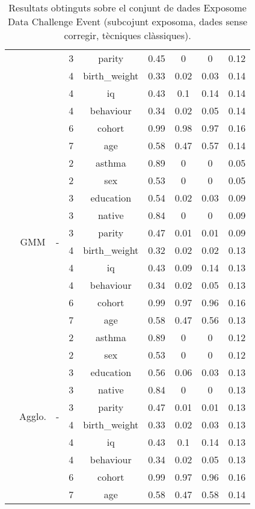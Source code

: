 \documentclass[CAT,BIB]{TFUOC}%
\begin{document}
\begin{table}
\begin{tabular}{@{}ccccccccc@{}}
            &  &  & 3 & parity & 0.45 & 0 & 0 & 0.12 \\
            &  &  & 4 & birth\_weight & 0.33 & 0.02 & 0.03 & 0.14 \\
            &  &  & 4 & iq & 0.43 & 0.1 & 0.14 & 0.14 \\
            &  &  & 4 & behaviour & 0.34 & 0.02 & 0.05 & 0.14 \\
            &  &  & 6 & cohort & 0.99 & 0.98 & 0.97 & 0.16 \\
            &  &  & 7 & age & 0.58 & 0.47 & 0.57 & 0.14 \\ \cmidrule(l){2-9}
            & \multirow{10}{*}{GMM} & \multirow{10}{*}{-} & 2 & asthma & 0.89 & 0 & 0 & 0.05 \\
            &  &  & 2 & sex & 0.53 & 0 & 0 & 0.05 \\
            &  &  & 3 & education & 0.54 & 0.02 & 0.03 & 0.09 \\
            &  &  & 3 & native & 0.84 & 0 & 0 & 0.09 \\
            &  &  & 3 & parity & 0.47 & 0.01 & 0.01 & 0.09 \\
            &  &  & 4 & birth\_weight & 0.32 & 0.02 & 0.02 & 0.13 \\
            &  &  & 4 & iq & 0.43 & 0.09 & 0.14 & 0.13 \\
            &  &  & 4 & behaviour & 0.34 & 0.02 & 0.05 & 0.13 \\
            &  &  & 6 & cohort & 0.99 & 0.97 & 0.96 & 0.16 \\
            &  &  & 7 & age & 0.58 & 0.47 & 0.56 & 0.13 \\ \cmidrule(l){2-9}
            & \multirow{10}{*}{Agglo.} & \multirow{10}{*}{-} & 2 & asthma & 0.89 & 0 & 0 & 0.12 \\
            &  &  & 2 & sex & 0.53 & 0 & 0 & 0.12 \\
            &  &  & 3 & education & 0.56 & 0.06 & 0.03 & 0.13 \\
            &  &  & 3 & native & 0.84 & 0 & 0 & 0.13 \\
            &  &  & 3 & parity & 0.47 & 0.01 & 0.01 & 0.13 \\
            &  &  & 4 & birth\_weight & 0.33 & 0.02 & 0.03 & 0.13 \\
            &  &  & 4 & iq & 0.43 & 0.1 & 0.14 & 0.13 \\
            &  &  & 4 & behaviour & 0.34 & 0.02 & 0.05 & 0.13 \\
            &  &  & 6 & cohort & 0.99 & 0.97 & 0.96 & 0.16 \\
            &  &  & 7 & age & 0.58 & 0.47 & 0.58 & 0.14 \\ \bottomrule
        \end{tabular}
        \caption[Exposome Data Challenge Event: resultats - part 7]{
            Resultats obtinguts sobre el conjunt de dades Exposome Data Challenge Event
            (subcojunt exposoma, dades sense corregir, tècniques clàssiques).
        }
        \label{t:results_exposome7}
    \end{table}
\end{document}
